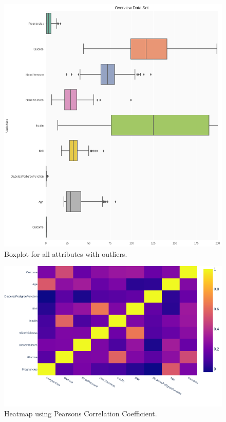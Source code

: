 \documentclass[12pt]{article}
\begin{document}
\begin{figure}[ht]
\centering
\includegraphics[width=1\textwidth]{3.png}
\caption{\label{fig:10} Boxplot for all attributes with outliers.}
\end{figure}

\begin{figure}[ht]
\centering
\includegraphics[width=1\textwidth]{4a.png}
\caption{\label{fig:11} Heatmap using Pearsons Correlation Coefficient.}
\end{figure}
\end{document}
